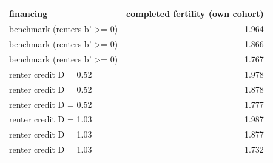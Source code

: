 \begin{tabular}{lr}
\toprule
financing & completed fertility (own cohort) \\
\midrule
benchmark (renters b' >= 0) & 1.964 \\
benchmark (renters b' >= 0) & 1.866 \\
benchmark (renters b' >= 0) & 1.767 \\
renter credit D = 0.52 & 1.978 \\
renter credit D = 0.52 & 1.878 \\
renter credit D = 0.52 & 1.777 \\
renter credit D = 1.03 & 1.987 \\
renter credit D = 1.03 & 1.877 \\
renter credit D = 1.03 & 1.732 \\
\bottomrule
\end{tabular}
